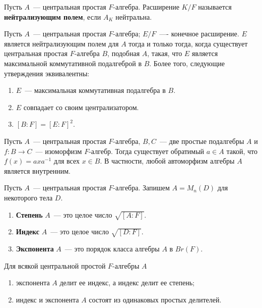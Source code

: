 \documentclass[a4paper,oneside,12pt]{article}
\theoremstyle{plain} { \swapnumbers
\newtheorem{theorem}{Теорема}[subsection]
\newtheorem{corollary}[theorem]{Следствие}
\newtheorem{lemma}[theorem]{Лемма}
\newtheorem{proposition}[theorem]{Утверждение}
\newtheorem{claim}[theorem]{Факт}
}
\theoremstyle{definition} { \swapnumbers
\newtheorem{definition}[theorem]{Определение}
\newtheorem{notation}[theorem]{Обозначение}
\newtheorem{remark}[theorem]{Замечание}
\newtheorem{remarks}[theorem]{Замечания}
\newtheorem{example}[theorem]{Пример}
\newtheorem{examples}[theorem]{Примеры}
\newtheorem{sssection}[theorem]{}
}
\begin{document}
\begin{definition}
Пусть $A$~--- центральная простая $F$-алгебра. Расширение $K/F$ называется
{\bf нейтрализующим полем}, если $A_K$ нейтральна.
\end{definition}

\begin{theorem}
Пусть $A$~--- центральная простая $F$-алгебра; $E/F$~---- конечное расширение.
$E$ является нейтрализующим полем для $A$ тогда и только тогда, когда существует
центральная простая $F$-алгебра $B$, подобная $A$, такая, что $E$ является максимальной
коммутативной подалгеброй в $B$. Более того, следующие утверждения эквивалентны:
\begin{enumerate}
\item $E$~--- максимальная коммутативная подалгебра в $B$.
\item $E$ совпадает со своим централизатором.
\item $[B:F]=[E:F]^2$.
\end{enumerate}
\end{theorem}

\begin{theorem}
Пусть $A$~--- центральная простая $F$-алгебра, $B,C$~--- две простые подалгебры $A$
и $f\colon B\to C$~--- изоморфизм $F$-алгебр. Тогда существует обратимый $a\in A$ такой,
что $f(x)=axa^{-1}$ для всех $x\in B$. В частности, любой автоморфизм алгебры $A$
является внутренним.
\end{theorem}


\begin{definition}
Пусть $A$~--- центральная простая $F$-алгебра. Запишем $A=M_n(D)$ для некоторого тела $D$.
\begin{enumerate}
\item {\bf Степень} $A$~--- это целое число $\sqrt{[A:F]}$.
\item {\bf Индекс} $A$~--- это целое число $\sqrt{[D:F]}$.
\item {\bf Экспонента} $A$~--- это порядок класса алгебры $A$ в $Br(F)$.
\end{enumerate}
\end{definition}

\begin{proposition}
Для всякой центральной простой $F$-алгебры $A$
\begin{enumerate}
\item экспонента $A$ делит ее индекс, а индекс делит ее степень;
\item индекс и экспонента $A$ состоят из одинаковых простых делителей. %
\end{enumerate}
\end{proposition}
\end{document}
